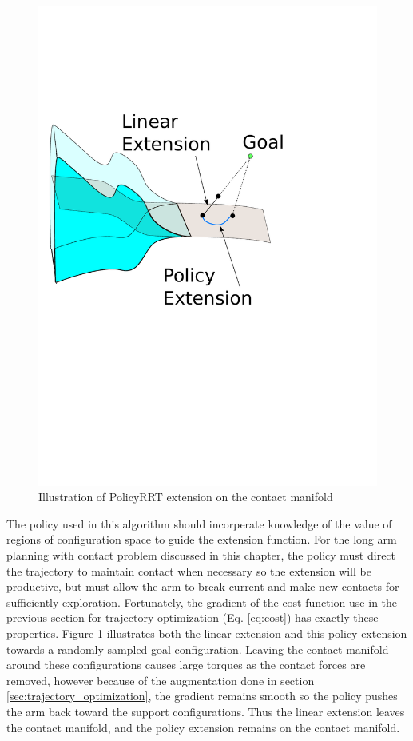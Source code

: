 \documentclass[../thesis.tex]{subfiles}
\begin{document}
\begin{figure}
  \centering
  \includegraphics[width=.5\linewidth]{./Planning/extend.pdf}
  
  \caption{Illustration of PolicyRRT extension on the contact manifold}
  \label{fig:extend}
\end{figure}





The policy used in this algorithm should incorperate knowledge of the value of regions of configuration space to guide the extension function.
For the long arm planning with contact problem discussed in this chapter, the policy must direct the trajectory to maintain contact when necessary so the extension will be productive, but must allow the arm to break current and make new contacts for sufficiently exploration.
Fortunately, the gradient of the cost function use in the previous section for trajectory optimization (Eq. \ref{eq:cost}) has exactly these properties.
Figure \ref{fig:extend} illustrates both the linear extension and this policy extension towards a randomly sampled goal configuration.
Leaving the contact manifold around these configurations causes large torques as the contact forces are removed, however because of the augmentation done in section \ref{sec:trajectory_optimization}, the gradient remains smooth so the policy pushes the arm back toward the support configurations.
Thus the linear extension leaves the contact manifold, and the policy extension remains on the contact manifold.
\end{document}
